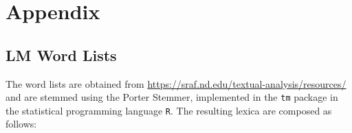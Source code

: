 \appendix
\section{Appendix}


\subsection{LM Word Lists}
\label{sec: annex_lm-lists}

The word lists are obtained from \url{https://sraf.nd.edu/textual-analysis/resources/} and are stemmed using the Porter Stemmer, implemented in the \texttt{tm} package in the statistical programming language \texttt{R}. The resulting lexica are composed as follows:

